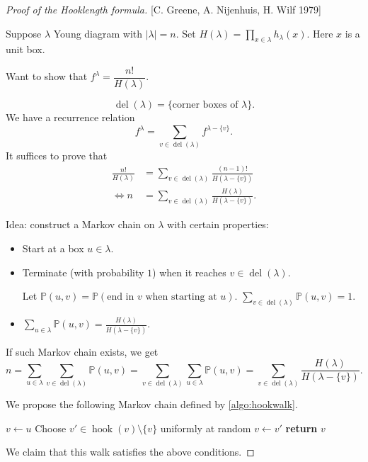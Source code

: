 \documentclass{report}
\newcommand{\matP}{\mathbb{P}}
\def \del {\operatorname{del}}
\theoremstyle{definition}
\theoremstyle{remark}
\numberwithin{equation}{section}
\begin{document}
\begin{proof}[Proof of the Hooklength formula]
[C. Greene, A. Nijenhuis, H. Wilf 1979]

Suppose $\lambda$ Young diagram with $|\lambda| = n$.
Set $H(\lambda) = \prod_{x \in \lambda}h_\lambda(x)$. Here $x$ is a unit box. 

Want to show that $f^\lambda = \dfrac{n!}{H(\lambda)}$.

\[\del(\lambda) = \{\text{corner boxes of } \lambda\}.\]
We have a recurrence relation\[
    f^\lambda = \sum_{v \in \del(\lambda)} f^{\lambda - \{v\}}.
\]
It suffices to prove that \begin{align*}
    \frac{n!}{H(\lambda)} & = \sum_{v \in \del(\lambda)} \frac{(n-1)!}{H(\lambda - \{v\})} \\
    \iff n & = \sum_{v \in \del(\lambda)} \frac{H(\lambda)}{H(\lambda - \{v\})}. 
\end{align*}

Idea: construct a Markov chain on $\lambda$ with certain properties: \begin{itemize}
    \item Start at a box $u \in \lambda$.
    \item Terminate (with probability $1$) when it reaches $v \in \del(\lambda)$.
    
    Let $\matP(u, v) = \matP(\text{end in $v$ when starting at $u$})$. $\sum_{v \in \del(\lambda)} \matP(u, v) = 1$. 
    \item $\displaystyle \sum_{u \in \lambda}\matP(u, v) = \frac{H(\lambda)}{H(\lambda - \{v\})}$.
\end{itemize}
If such Markov chain exists, we get \[
    n = \sum_{u \in \lambda} \sum_{v \in \del(\lambda)}\matP(u, v) = \sum_{v \in \del(\lambda)}\sum_{u \in \lambda} \matP(u, v) = \sum_{v \in \del(\lambda)} \frac{H(\lambda)}{H(\lambda - \{v\})}.
\]

We propose the following Markov chain defined by \autoref{algo:hookwalk}.
\begin{algorithm}[h]
    \caption{The Hook Walk}
    \label{algo:hookwalk}
    \begin{algorithmic}[1]
            \State $v \gets u$
            \While{$v \notin \del(\lambda)$} 
                \State Choose $v' \in \operatorname{hook}(v) \setminus \{v\}$ uniformly at random
                \State $v \gets v'$
            \EndWhile
            \State \textbf{return} $v$
        \EndFunction
    \end{algorithmic}
\end{algorithm}
We claim that this walk satisfies the above conditions.


\end{proof}
\end{document}
